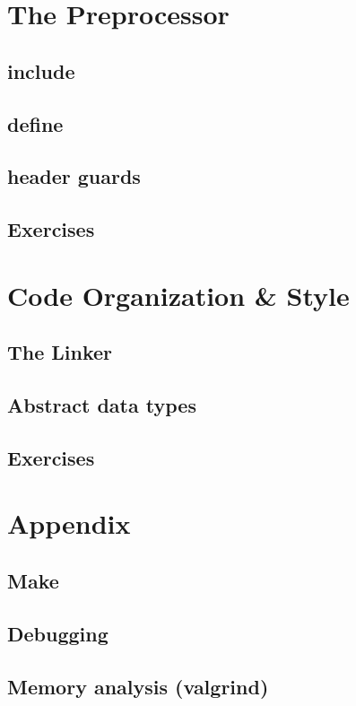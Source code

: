 \documentclass[ebook,11pt,oneside,openany]{memoir}
\begin{document}

\chapter{The Preprocessor}
\label{ch:pre}
\section{include}
\section{define}
\section{header guards}
\section{Exercises}

\chapter{Code Organization \& Style}
\label{ch:org}
\section{The Linker}
\section{Abstract data types}
\section{Exercises}

\chapter{Appendix}
\section{Make}
\section{Debugging}
\section{Memory analysis (valgrind)}
\end{document}
